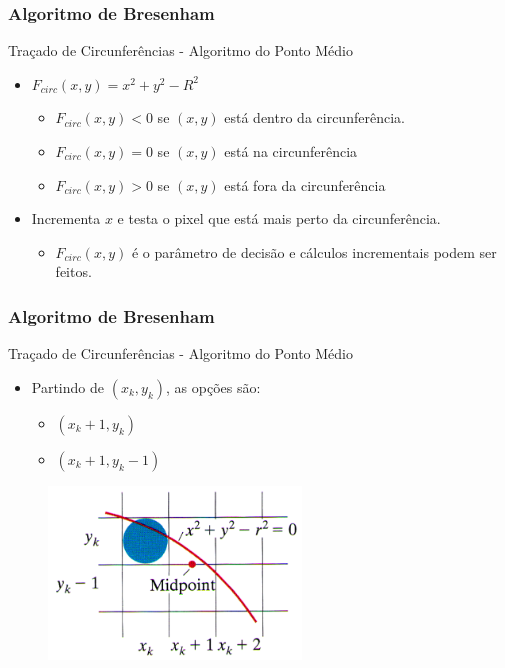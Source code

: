 \documentclass{beamer}
\begin{document}
\begin{frame}
\frametitle{Algoritmo de Bresenham}
		\begin{block}{Traçado de Circunferências - Algoritmo do Ponto Médio}
		\begin{itemize}
			\item $F_{circ}(x,y) = x^2 + y^2 - R^2$
				\begin{itemize}
					\item $F_{circ}(x,y) < 0$ se $(x,y)$ está dentro da circunferência.
					\item $F_{circ}(x,y) = 0$ se $(x,y)$ está na circunferência
					\item $F_{circ}(x,y) > 0$ se $(x,y)$ está fora da circunferência				
				\end{itemize}
			\item Incrementa $x$ e testa o pixel que está mais perto da circunferência.
			\begin{itemize}
				\item  $F_{circ}(x,y)$ é o parâmetro de decisão e cálculos incrementais podem ser feitos.
			\end{itemize}
		\end{itemize}
	\end{block}
\end{frame}


\begin{frame}
\frametitle{Algoritmo de Bresenham}
		\begin{block}{Traçado de Circunferências - Algoritmo do Ponto Médio}
		\begin{itemize}
			\item Partindo de $(x_k,y_k)$, as opções são:
				\begin{itemize}
					\item $(x_k+1,y_k)$
					\item $(x_k+1,y_k-1)$
				\end{itemize}
		\end{itemize}
	\end{block}
	
	\begin{figure}[!h]
			\begin{center}
			\includegraphics[width=0.6\textwidth]{Figures/CirAlg}
			\end{center}
		\end{figure}
\end{frame}
\end{document}
